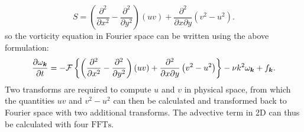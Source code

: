 \documentclass[12pt]{article}
\begin{document}
\begin{equation}\label{inertial-compact}
S =\left(\dfrac{\partial^2}{\partial x^2}-\dfrac{\partial^2}{\partial y^2}\right)(uv)+\dfrac{\partial^2}{\partial x \partial y}\left(v^2 - u^2 \right).
\end{equation}
so the vorticity equation in Fourier space can be written using the above formulation:
\begin{equation}\label{four-FFTs}
\frac{\partial\omega_{{\bm k}}}{\partial t} =- \mathcal{F}\left\lbrace\left(\dfrac{\partial^2}{\partial x^2}-\dfrac{\partial^2}{\partial y^2}\right)(uv)+\dfrac{\partial^2}{\partial x \partial y}\left(v^2 - u^2 \right)\right\rbrace-\nu k^2\omega_{{\bm k}} + f_{{\bm k}}.
\end{equation}
Two transforms are required to compute $u$ and $v$ in physical space, from which the quantities $uv$ and $v^2-u^2$ can then be calculated and transformed back to Fourier space with two additional transforms. The advective term in 2D can thus be calculated with four $\text{FFTs}$.

\hypertarget{Bibliography}{}


\hypertarget{Index}{}
\printindex
\end{document}
